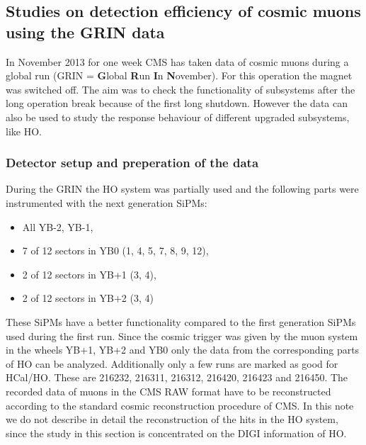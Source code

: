 	\subsection{Studies on detection efficiency of cosmic muons using the GRIN data} 
		In November 2013 for one week CMS has taken data of cosmic muons during a global run (GRIN = \textbf{G}lobal \textbf{R}un \textbf{I}n \textbf{N}ovember).
		For this operation the magnet was switched off.
		The aim was to check the functionality of subsystems after the long operation break because of the first long shutdown.
		However the data can also be used to study the response behaviour of different upgraded subsystems, like HO.
		\subsubsection{Detector setup and preperation of the data}
			During the GRIN the HO system was partially used and the following parts were instrumented with the next generation SiPMs:
			\begin{itemize}
				\item All YB-2, YB-1,
				\item 7 of 12 sectors in YB0 (1, 4, 5, 7, 8, 9, 12),
				\item 2 of 12 sectors in YB+1 (3, 4),
				\item 2 of 12 sectors in YB+2 (3, 4)
			\end{itemize}
			These SiPMs have a better functionality compared to the first generation SiPMs used during the first run.
			Since the cosmic trigger was given by the muon system in the wheels YB+1, YB+2 and YB0 only the data from the corresponding parts of HO can be analyzed.
			Additionally only a few runs are marked as good for HCal/HO.
			These are 216232, 216311, 216312, 216420, 216423 and 216450.
			The recorded data of muons in the CMS RAW format have to be reconstructed according to the standard cosmic reconstruction procedure of CMS.
			In this note we do not describe in detail the reconstruction of the hits in the HO system, since the study in this section is concentrated on the DIGI information of HO.
